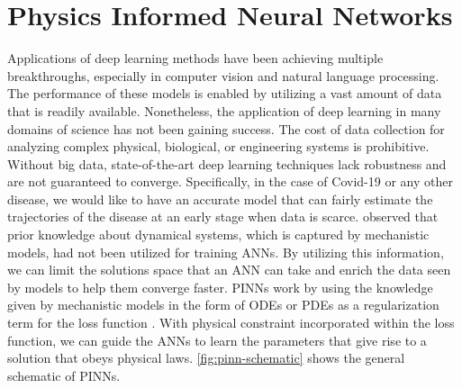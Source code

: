 \section{Physics Informed Neural Networks}
\label{sec:literature-review-physics-informed-neural-network}

Applications of deep learning methods have been achieving multiple breakthroughs, especially in computer vision and natural language processing.
The performance of these models is enabled by utilizing a vast amount of data that is readily available.
Nonetheless, the application of deep learning in many domains of science has not been gaining success.
The cost of data collection for analyzing complex physical, biological, or engineering systems is prohibitive.
Without big data, state-of-the-art deep learning techniques lack robustness and are not guaranteed to converge.
Specifically, in the case of Covid-19 or any other disease, we would like to have an accurate model that can fairly estimate the trajectories of the disease at an early stage when data is scarce.
\citeauthor{raissiPhysicsinformedNeuralNetworks2019} \cite{raissiPhysicsinformedNeuralNetworks2019} observed that prior knowledge about dynamical systems, which is captured by mechanistic models, had not been utilized for training \glspl{ANN}.
By utilizing this information, we can limit the solutions space that an \gls{ANN} can take and enrich the data seen by models to help them converge faster.
\glspl{PINN} work by using the knowledge given by mechanistic models in the form of \glspl{ODE} or \glspl{PDE} as a regularization term for the loss function \cite{raissiPhysicsinformedNeuralNetworks2019, lagarisArtificialNeuralNetworks1998}.
With physical constraint incorporated within the loss function, we can guide the \glspl{ANN} to learn the parameters that give rise to a solution that obeys physical laws.
\autoref{fig:pinn-schematic} shows the general schematic of \glspl{PINN}.

